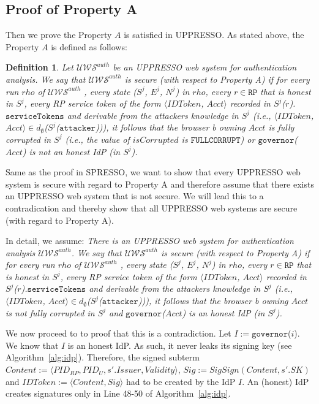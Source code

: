 \documentclass[letterpaper,onecolumn,10pt]{article}
\newtheorem{definition}{Definition}
\begin{document}
\subsection{Proof of Property A}
Then we prove the Property $A$ is satisfied in UPPRESSO.
As stated above, the Property $A$ is defined as follows:
\begin{definition}
Let $\mathcal{U\!W\!S}^{auth}$  be an UPPRESSO web system for authentication analysis. We say that $\mathcal{U\!W\!S}^{auth}$  is secure (with respect to Property A) if for every run $rho$ of $\mathcal{U\!W\!S}^{auth}$ , every state ($S^j$, $E^j$, $N^j$) in $rho$, every $r \in \mathtt{RP}$ that is honest in
$S^j$, every RP service token of the form $\langle IDToken$, $Acct \rangle$ recorded in $S^j$($r$).$\mathtt{serviceTokens}$ and derivable from the attackers knowledge in $S^j$ (i.e., $\langle IDToken$, $Acct \rangle \in d_{\emptyset}$($S^j$($\mathtt{attacker}$))), it follows that the browser b owning $Acct$ is fully corrupted in $S^j$ (i.e., the value of $isCorrupted$ is $\mathtt{FULLCORRUPT}$) or $\mathtt{governor}$($Acct$) is not an honest IdP (in $S^j$).
\end{definition}


Same as the proof in SPRESSO, we want to show that every UPPRESSO web system is secure with regard to Property A and therefore assume that there exists an UPPRESSO web system that is not secure. We will lead this to a contradication and thereby show that all UPPRESSO web systems are secure (with regard to Property A).

 In detail, we assume: \emph{There is an UPPRESSO web system for authentication analysis $\mathcal{U\!W\!S}^{auth}$. We say that $\mathcal{U\!W\!S}^{auth}$  is secure (with respect to Property A) if for every run $rho$ of $\mathcal{U\!W\!S}^{auth}$ , every state ($S^j$, $E^j$, $N^j$) in $rho$, every $r \in \mathtt{RP}$ that is honest in
$S^j$, every RP service token of the form $\langle IDToken$, $Acct \rangle$ recorded in $S^j$($r$).$\mathtt{serviceTokens}$ and derivable from the attackers knowledge in $S^j$ (i.e., $\langle IDToken$, $Acct \rangle \in d_{\emptyset}$($S^j$($\mathtt{attacker}$))), it follows that the browser b owning $Acct$ is not fully corrupted in $S^j$ and $\mathtt{governor}$($Acct$) is an honest IdP (in $S^j$).}

We now proceed to to proof that this is a contradiction. Let $I := \mathtt{governor}$($i$). We know that $I$ is an honest IdP. As such, it never leaks its signing key (see Algorithm~\ref{alg:idp}). Therefore, the signed subterm $Content := \langle PID_{RP}, PID_U, s'.Issuer, Validity \rangle$, $Sig := SigSign(Content, s'.SK)$ and $IDToken := \langle Content, Sig \rangle$ had to be created by the IdP $I$.  An (honest) IdP creates signatures only in Line 48-50 of Algorithm~\ref{alg:idp}.
\end{document}
